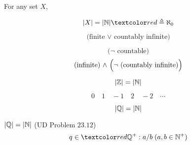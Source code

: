 \begin{frame}{}
  \begin{definition}[Infinite]
    For any set $X$,
    \begin{description}
      \item[Countably Infinite]
	\[
	  |X| = |\N| \red{\;\triangleq \aleph_{0}}
	\]
      \item[Countable]
	\[
	  \text{(finite $\lor$ countably infinite)}
	\]
      \item[Uncountable] 
	\[
	  \text{($\lnot$ countable)}
	\]
	\[
	  \text{(infinite) $\land$ \Big($\lnot$ (countably infinite)\Big)}
	\]
    \end{description}
  \end{definition}
\end{frame}

\begin{frame}{}
\end{frame}

\begin{frame}{}
  \begin{theorem}[$\Z$ is Countable.]
    \[
      |\mathbb{Z}| = |\mathbb{N}|
    \]
  \end{theorem}


  \pause
  \[
    0 \quad 1 \quad -1 \quad 2 \quad -2 \quad \cdots
  \]
\end{frame}

\begin{frame}{}
  \begin{theorem}
    \[
      |\mathbb{Q}| = |\mathbb{N}|
    \]
  \end{theorem}

  \pause
  \begin{exampleblock}{$|\mathbb{Q}| = |\mathbb{N}|$ (UD Problem $23.12$)}
    \[
      q \in \red{\Q^{+}}: a / b \; (a,b \in \N^{+})
    \]

    \pause
    \vspace{-0.30cm}
    \begin{columns}
    \end{columns}
  \end{exampleblock}
\end{frame}

